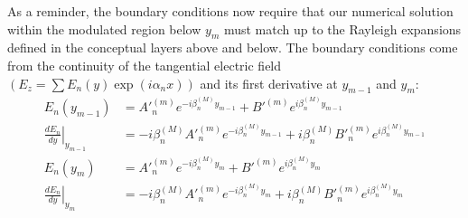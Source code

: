 As a reminder, the boundary conditions now require that our numerical solution within the modulated region below $y_m$ must match up to the Rayleigh expansions defined in the conceptual layers above and below. The boundary conditions come from the continuity of the tangential electric field $\left(E_z = \sum E_n(y) \exp{\left(i \alpha_n x\right)} \right)$ and its first derivative at $y_{m-1}$ and $y_m$:
\begin{align}
\label{eqnBounds1S}
E_n(y_{m-1}) &= A'^{(m)}_n e^{-i \beta^{(M)}_n y_{m-1}} + B'^{(m)} e^{i \beta^{(M)}_n y_{m-1}} \\
\label{eqnBounds2S}
\left. \frac{dE_n}{dy} \right|_{y_{m-1}} &= -i \beta^{(M)}_n A'^{(m)}_n e^{-i \beta^{(M)}_n y_{m-1}} + i \beta^{(M)}_n B'^{(m)}_n e^{i \beta^{(M)}_n y_{m-1}}  \\
\label{eqnBounds3S}
E_n(y_m) &= A'^{(m)}_n e^{-i \beta^{(M)}_n y_m} + B'^{(m)} e^{i \beta^{(M)}_n y_m} \\
\label{eqnBounds4S}
\left. \frac{dE_n}{dy} \right|_{y_m} &= -i \beta^{(M)}_n A'^{(m)}_n e^{-i \beta^{(M)}_n y_m} + i \beta^{(M)}_n B'^{(m)}_n e^{i \beta^{(M)}_n y_m}
\end{align}


